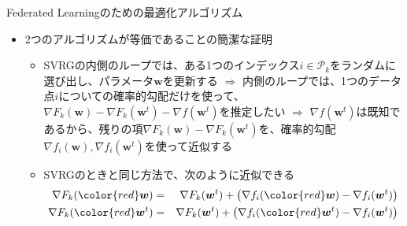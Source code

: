 \documentclass[dvipdfmx,notheorems,t]{beamer}
\begin{document}
\begin{frame}{Federated Learningのための最適化アルゴリズム}

\begin{itemize}
	\item 2つのアルゴリズムが等価であることの簡潔な証明
	\begin{itemize}
		\item SVRGの内側のループでは、ある1つのインデックス$i \in \mathcal{P}_k$をランダムに選び出し、パラメータ$\bm{w}$を更新する \newline \newline
		$\Rightarrow$ 内側のループでは、1つのデータ点$i$についての\alert{確率的勾配だけを使って}、$\nabla F_k(\bm{w}) - \nabla F_k(\bm{w}^t) - \nabla f(\bm{w}^t)$を推定したい \newline \newline
		$\Rightarrow$ $\nabla f(\bm{w}^t)$は既知であるから、残りの項$\nabla F_k(\bm{w}) - \nabla F_k(\bm{w}^t)$を、確率的勾配$\nabla f_i(\bm{w}), \nabla f_i(\bm{w}^t)$を使って近似する
		\newline
		
		\item SVRGのときと同じ方法で、次のように近似できる
		\begin{eqnarray}
			\nabla F_k(\color{red}\bm{w}\normalcolor) &=& \nabla F_k(\bm{w}^t) + \left( \nabla f_i(\color{red}\bm{w}\normalcolor) - \nabla f_i(\bm{w}^t) \right) \\
			\nabla F_k(\color{red}\bm{w}^t\normalcolor) &=& \nabla F_k(\bm{w}^t) + \left( \nabla f_i(\color{red}\bm{w}^t\normalcolor) - \nabla f_i(\bm{w}^t) \right)
		\end{eqnarray}
	\end{itemize}
\end{itemize}

\end{frame}
\end{document}
